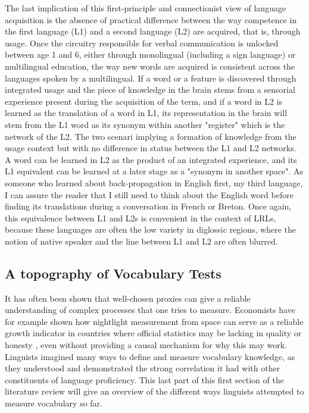 The last implication of this first-principle and connectionist view of language acquisition is the absence of practical difference between the way competence in the first language (L1) and a second language (L2) are acquired, that is, through usage. Once the circuitry responsible for verbal communication is unlocked between age 1 and 6, either through monolingual (including a sign language) or multilingual education, the way new words are acquired is consistent across the languages spoken by a multilingual. If a word or a feature is discovered through integrated usage and the piece of knowledge in the brain stems from a sensorial experience present during the acquisition of the term, and if a word in L2 is learned as the translation of a word in L1, its representation in the brain will stem from the L1 word as its synonym within another "register" which is the network of the L2. The two scenari implying a formation of knowledge from the usage context but with no difference in status between the L1 and L2 networks. A word can be learned in L2 as the product of an integrated experience, and its L1 equivalent can be learned at a later stage as a "synonym in another space". As someone who learned about back-propagation in English first, my third language, I can assure the reader that I still need to think about the English word before finding its translations during a conversation in French or Breton. Once again, this equivalence between L1 and L2s is convenient in the context of LRLs, because these languages are often the low variety in diglossic regions, where the notion of native speaker and the line between L1 and L2 are often blurred.

    \subsection{A topography of Vocabulary Tests}
It has often been shown that well-chosen proxies can give a reliable understanding of complex processes that one tries to measure. Economists have for example shown how nightlight measurement from space can serve as a reliable growth indicator in countries where official statistics may be lacking in quality or honesty \parencite{henderson_measuring_2009}, even without providing a causal mechanism for why this may work. Linguists imagined many ways to define and measure vocabulary knowledge, as they understood and demonstrated the strong correlation it had with other constituents of language proficiency. This last part of this first section of the literature review will give an overview of the different ways linguists attempted to measure vocabulary so far.
